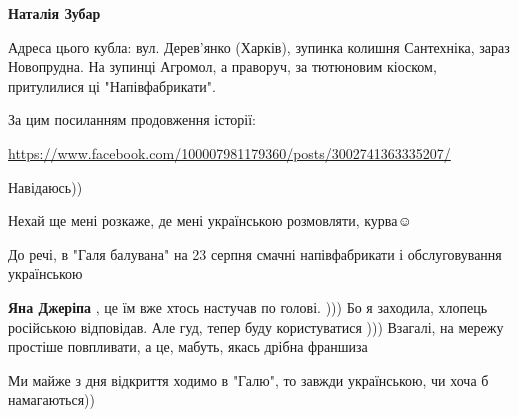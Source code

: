 \begin{itemize}
\begin{itemize}
\textbf{Наталія Зубар} 

Адреса цього кубла: вул. Дерев'янко (Харків), зупинка колишня Сантехніка, зараз
Новопрудна. На зупинці Агромол, а праворуч, за тютюновим кіоском, притулилися
ці "Напівфабрикати".

За цим посиланням продовження історії: 

\url{https://www.facebook.com/100007981179360/posts/3002741363335207/}

 
Навідаюсь))

 
Нехай ще мені розкаже, де мені українською розмовляти, курва☺

 
До речі, в "Галя балувана" на 23 серпня смачні напівфабрикати і обслуговування українською

 
\textbf{Яна Джеріпа} , це їм вже хтось настучав по голові. ))) Бо я заходила, хлопець російською відповідав. Але гуд, тепер буду користуватися ))) Взагалі, на мережу простіше повпливати, а це, мабуть, якась дрібна франшиза

 
Ми майже з дня відкриття ходимо в "Галю", то завжди українською, чи хоча б намагаються))


\end{itemize}
\end{itemize}
